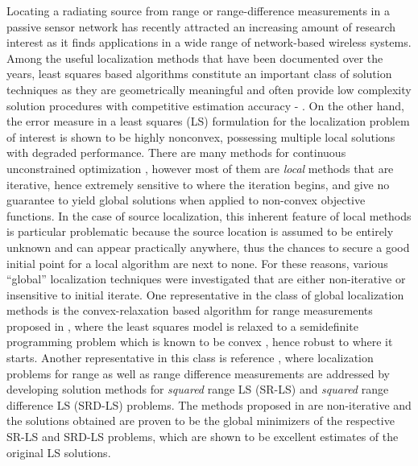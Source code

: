 \label{chapter:irw}

Locating a radiating source from range or range-difference measurements in a passive sensor network has recently attracted an increasing amount of research interest as it finds applications in a wide range of network-based wireless systems. Among the useful localization methods that have been documented over the years, least squares based algorithms constitute an important class of solution techniques as they are geometrically meaningful and often provide low complexity solution procedures with competitive estimation accuracy \cite{SmithAbel} - \cite{BeckStLi}. On the other hand, the error measure in a least squares (LS) formulation for the localization problem of interest is shown to be highly nonconvex, possessing multiple local solutions with degraded performance.  There are many methods for continuous unconstrained optimization \cite{AntonLu}, however most of them are \textit{local} methods that are iterative, hence extremely sensitive to where the iteration begins, and give no guarantee to yield global solutions when applied to non-convex objective functions. In the case of source localization, this inherent feature of local methods is particular problematic because the source location is assumed to be entirely unknown and can appear practically anywhere, thus the chances to secure a good initial point for a local algorithm are next to none. For these reasons, various ``global'' localization techniques were investigated that are either non-iterative or insensitive to initial iterate. One representative in the class of global localization methods is the convex-relaxation based algorithm for range measurements proposed in \cite{Cheung}, where the least squares model is relaxed to a semidefinite programming problem which is known to be convex \cite{VBoyd}, hence robust to where it starts. Another representative in this class is reference \cite{BeckStLi}, where localization problems for  range as well as range difference measurements are addressed by developing solution methods for \textit{squared} range LS (SR-LS) and \textit{squared} range difference LS (SRD-LS) problems. The methods proposed in \cite{BeckStLi} are non-iterative and the solutions obtained are proven to be the global minimizers of the respective SR-LS and SRD-LS problems, which are shown to be excellent estimates of the original LS solutions.

